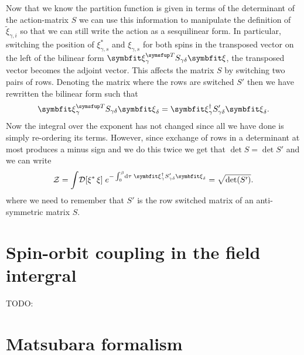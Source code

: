 Now that we know the partition function is given in terms of the determinant of the action-matrix $S$ we can use this information to manipulate the definition
of $\tilde{\xi}_{\gamma,i}$ so that we can still write the action as a sesquilinear form. In particular, switching the position of $\xi_{\gamma,s}^\ast$ and
$\xi_{\gamma,s}$ for both spins in the transposed vector on the left of the bilinear form $\v{\xi}_\gamma^\trans S_{\gamma\delta} \v{\xi}$, the transposed
vector becomes the adjoint vector. This affects the matrix $S$ by switching two pairs of rows. Denoting the matrix where the rows are switched $S'$ then
we have rewritten the bilinear form such that
\begin{equation}
    \label{eq:Field:Ferm:ExNambu:bilinearToSesqui}
    \v{\xi}_\gamma^\trans S_{\gamma\delta}\v{\xi}_\delta = \v{\xi}_\gamma^\dagger S'_{\gamma\delta}\v{\xi}_\delta.
\end{equation}
Now the integral over the exponent has not changed since all we have done is simply re-ordering its terms. However, since exchange of rows in a determinant
at most produces a minus sign and we do this twice we get that $\det S = \det S'$ and we can write
\begin{equation}
    \label{eq:Field:Ferm:ExNambu:partitionFunction:sesquilinear}
    \mathcal{Z} = \int\!\mathcal{D}[\xi^\ast\,\xi]\;e^{-\int_0^\beta\!\mathrm{d}\tau\;\v{\xi}_{\gamma}^\dagger S'_{\gamma\delta}\v{\xi}_{\delta}} = \sqrt{\det(S')}.
\end{equation}
where we need to remember that $S'$ is the row switched matrix of an anti-symmetric matrix $S$.

\section{Spin-orbit coupling in the field intergral}
TODO:

\section{Matsubara formalism}

